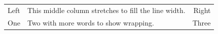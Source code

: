 \documentclass{article}
\begin{document}
\begin{tabularx}{\linewidth}{lXr}
Left & This middle column stretches to fill the line width. & Right \\
One & Two with more words to show wrapping. & Three \\
\end{tabularx}
\end{document}
